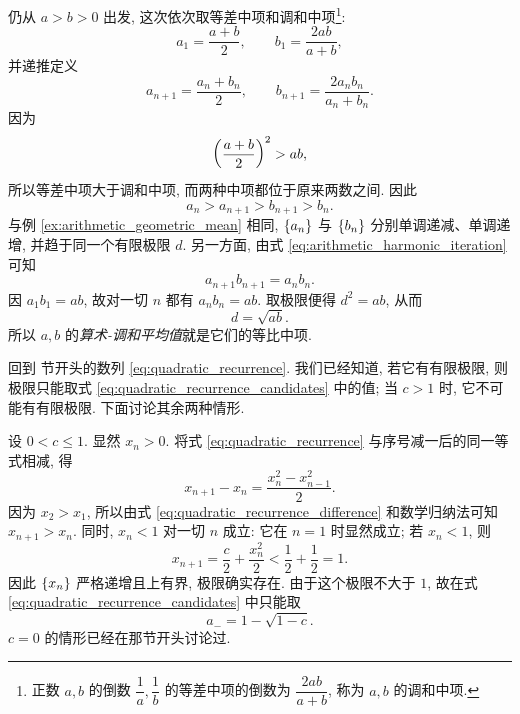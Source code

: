\label{ex:arithmetic_harmonic_mean}
仍从 $a>b>0$ 出发, 这次依次取等差中项和调和中项\footnote{正数 $a,b$ 的倒数
$\dfrac1a,\dfrac1b$ 的等差中项的倒数为 $\dfrac{2ab}{a+b}$,
称为 $a,b$ 的调和中项.}:
$$
a_1=\frac{a+b}{2},\qquad b_1=\frac{2ab}{a+b},
$$
并递推定义
\begin{equation}\label{eq:arithmetic_harmonic_iteration}
a_{n+1}=\frac{a_n+b_n}{2},\qquad
b_{n+1}=\frac{2a_nb_n}{a_n+b_n}.
\end{equation}
因为
$$
\left( \frac{a+b}{2} \right)^2>ab,
$$
所以等差中项大于调和中项, 而两种中项都位于原来两数之间. 因此
$$
a_n>a_{n+1}>b_{n+1}>b_n.
$$
与例 \ref{ex:arithmetic_geometric_mean} 相同, $\{a_{n}\}$ 与 $\{b_{n}\}$
分别单调递减、单调递增, 并趋于同一个有限极限 $d$.
另一方面, 由式 \eqref{eq:arithmetic_harmonic_iteration} 可知
$$
a_{n+1}b_{n+1}=a_nb_n.
$$
因 $a_1b_1=ab$, 故对一切 $n$ 都有 $a_nb_n=ab$.
取极限便得 $d^2=ab$, 从而
$$
d=\sqrt{ab}.
$$
所以 $a,b$ 的\emph{算术-调和平均值}就是它们的等比中项.

\label{ex:quadratic_recurrence}
回到  节开头的数列
\eqref{eq:quadratic_recurrence}. 我们已经知道, 若它有有限极限,
则极限只能取式 \eqref{eq:quadratic_recurrence_candidates} 中的值;
当 $c>1$ 时, 它不可能有有限极限. 下面讨论其余两种情形.

\label{case:quadratic_recurrence_positive}
设 $0<c\leqslant1$. 显然 $x_n>0$. 将式
\eqref{eq:quadratic_recurrence} 与序号减一后的同一等式相减, 得
\begin{equation}\label{eq:quadratic_recurrence_difference}
x_{n+1}-x_n=\frac{x_n^2-x_{n-1}^2}{2}.
\end{equation}
因为 $x_2>x_1$, 所以由式 \eqref{eq:quadratic_recurrence_difference}
和数学归纳法可知 $x_{n+1}>x_n$. 同时, $x_n<1$ 对一切 $n$ 成立:
它在 $n=1$ 时显然成立; 若 $x_n<1$, 则
$$
x_{n+1}=\frac c2+\frac{x_n^2}{2}<\frac12+\frac12=1.
$$
因此 $\{x_{n}\}$ 严格递增且上有界, 极限确实存在.
由于这个极限不大于 $1$, 故在式 \eqref{eq:quadratic_recurrence_candidates} 中只能取
$$
a_-=1-\sqrt{1-c}.
$$
$c=0$ 的情形已经在那节开头讨论过.

